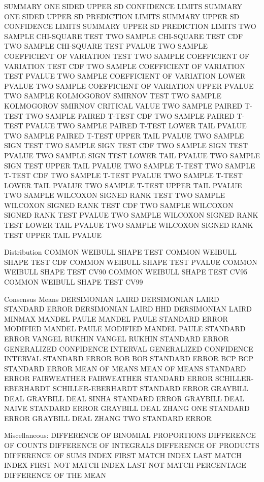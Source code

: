    SUMMARY ONE SIDED UPPER SD CONFIDENCE LIMITS
   SUMMARY ONE SIDED UPPER SD PREDICTION LIMITS
   SUMMARY UPPER SD CONFIDENCE LIMITS
   SUMMARY UPPER SD PREDICTION LIMITS
   TWO SAMPLE CHI-SQUARE TEST
   TWO SAMPLE CHI-SQUARE TEST CDF
   TWO SAMPLE CHI-SQUARE TEST PVALUE
   TWO SAMPLE COEFFICIENT OF VARIATION TEST
   TWO SAMPLE COEFFICIENT OF VARIATION TEST CDF
   TWO SAMPLE COEFFICIENT OF VARIATION TEST PVALUE
   TWO SAMPLE COEFFICIENT OF VARIATION LOWER PVALUE
   TWO SAMPLE COEFFICIENT OF VARIATION UPPER PVALUE
   TWO SAMPLE KOLMOGOROV SMIRNOV TEST
   TWO SAMPLE KOLMOGOROV SMIRNOV CRITICAL VALUE
   TWO SAMPLE PAIRED T-TEST
   TWO SAMPLE PAIRED T-TEST CDF
   TWO SAMPLE PAIRED T-TEST PVALUE
   TWO SAMPLE PAIRED T-TEST LOWER TAIL PVALUE
   TWO SAMPLE PAIRED T-TEST UPPER TAIL PVALUE
   TWO SAMPLE SIGN TEST
   TWO SAMPLE SIGN TEST CDF
   TWO SAMPLE SIGN TEST PVALUE
   TWO SAMPLE SIGN TEST LOWER TAIL PVALUE
   TWO SAMPLE SIGN TEST UPPER TAIL PVALUE
   TWO SAMPLE T-TEST
   TWO SAMPLE T-TEST CDF
   TWO SAMPLE T-TEST PVALUE
   TWO SAMPLE T-TEST LOWER TAIL PVALUE
   TWO SAMPLE T-TEST UPPER TAIL PVALUE
   TWO SAMPLE WILCOXON SIGNED RANK TEST
   TWO SAMPLE WILCOXON SIGNED RANK TEST CDF
   TWO SAMPLE WILCOXON SIGNED RANK TEST PVALUE
   TWO SAMPLE WILCOXON SIGNED RANK TEST LOWER TAIL PVALUE
   TWO SAMPLE WILCOXON SIGNED RANK TEST UPPER TAIL PVALUE

Distribution
   COMMON WEIBULL SHAPE TEST
   COMMON WEIBULL SHAPE TEST CDF
   COMMON WEIBULL SHAPE TEST PVALUE
   COMMON WEIBULL SHAPE TEST CV90
   COMMON WEIBULL SHAPE TEST CV95
   COMMON WEIBULL SHAPE TEST CV99

Consensus Means
   DERSIMONIAN LAIRD
   DERSIMONIAN LAIRD STANDARD ERROR
   DERSIMONIAN LAIRD HHD
   DERSIMONIAN LAIRD MINMAX
   MANDEL PAULE
   MANDEL PAULE STANDARD ERROR
   MODIFIED MANDEL PAULE
   MODIFIED MANDEL PAULE STANDARD ERROR
   VANGEL RUKHIN
   VANGEL RUKHIN STANDARD ERROR
   GENERALIZED CONFIDENCE INTERVAL
   GENERALIZED CONFIDENCE INTERVAL STANDARD ERROR
   BOB
   BOB STANDARD ERROR
   BCP
   BCP STANDARD ERROR
   MEAN OF MEANS
   MEAN OF MEANS STANDARD ERROR
   FAIRWEATHER
   FAIRWEATHER STANDARD ERROR
   SCHILLER-EBERHARDT
   SCHILLER-EBERHARDT STANDARD ERROR
   GRAYBILL DEAL
   GRAYBILL DEAL SINHA STANDARD ERROR
   GRAYBILL DEAL NAIVE STANDARD ERROR
   GRAYBILL DEAL ZHANG ONE STANDARD ERROR
   GRAYBILL DEAL ZHANG TWO STANDARD ERROR

Miscellaneous:
   DIFFERENCE OF BINOMIAL PROPORTIONS
   DIFFERENCE OF COUNTS
   DIFFERENCE OF INTEGRALS
   DIFFERENCE OF PRODUCTS
   DIFFERENCE OF SUMS
   INDEX FIRST MATCH
   INDEX LAST  MATCH
   INDEX FIRST NOT MATCH
   INDEX LAST  NOT MATCH
   PERCENTAGE DIFFERENCE OF THE MEAN

